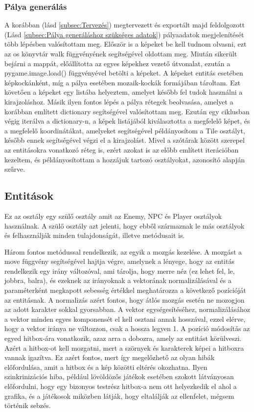 \subsubsection{Pálya generálás}

\indent \indent A korábban (lásd \ref{subsec:Tervezés}) megtervezett és exportált majd feldolgozott (Lásd \ref{subsec:Pálya generáláshoz szükséges adatok}) pályaadatok megjelenítését több lépésben valósítottam meg. Először is a képeket be kell tudnom olvasni, ezt az os \cite{Python-os} könyvtár walk függvényének segítségével oldottam meg.
 Miután sikerült bejárni a mappát, előállította az egyes képekhez vezető útvonalat, ezután a pygame.image.load() függvényével betölti a képeket. A képeket entitás esetében képkockánként, míg a pálya esetében mozaik-kockák formájában tároltam.
  Ezt követően a képeket egy listába helyeztem, amelyet később fel tudok használni a kirajzoláshoz.
   Másik ilyen fontos lépés a pálya rétegek beolvasása, amelyet a korábban említett dictionary segítségével valósítottam meg.
    Ezután egy ciklusban végig iterálva a dictionary-n, a képek listájából kiválasztotta a megfelelő képet, és a megfelelő koordinátákat,
     amelyeket segítségével példányosítom a Tile osztályt, később ennek segítségével végzi el a kirajzolást.
      Mivel a szótárak között szerepel az entitásokra vonatkozó réteg is, ezért azokat is az előbb említett iterációban kezeltem,
       és példányosítottam a hozzájuk tartozó osztályokat, azonosító alapján szűrve.

\subsection{Entitások}
\indent \indent Ez az osztály egy szülő osztály amit az Enemy, NPC és Player osztályok használnak. A szülő osztály azt jelenti, hogy ebből származnak le más osztályok és felhasználják minden tulajdonságát, illetve metódusait is.  

Három fontos metódussal rendelkezik, az egyik a mozgás kezelése. A mozgást a move függvény segítségével hajtja végre, amelynek a lényege, hogy az entitás rendelkezik egy irány változóval, ami tárolja, hogy merre néz (ez lehet fel, le, jobbra, balra), és ezeknek az irányoknak a vektorának normalizálásával és a paraméterként megkapott sebesség értékkel meghatározza a következő pozícióját az entitásnak. A normalizás azért fontos, hogy átlós mozgás esetén ne mozogjon az adott karakter sokkal gyorsabban. A vektor egységesítéséhez, normalizálásához a vektor minden egyes komponensét el kell osztani annak hosszával, ezzel elérve, hogy a vektor iránya ne változzon, csak a hossza legyen 1. A pozíció módosítás az egyed hitbox-ára vonatkozik, azaz arra a dobozra, amely az entitást körülveszi. Azért a hitbox-ot kell mozgatni, mert a szörnyek és karakterek képei a hitboxra vannak igazítva. Ez azért fontos, mert így megelőzhető az olyan hibák előfordulása, amit a hitbox és a kép közötti eltérés okozhatna. Ilyen szinkrinizációs hiba, például lövöldözős játékok esetében szokott látványosan előfordulni, hogy egy bizonyos testrész hitbox-a nem ott helyezkedik el ahol a grafika, és a játékosok miközben látják, hogy eltalálják az ellenfelet, mégsem történik sebzés.

